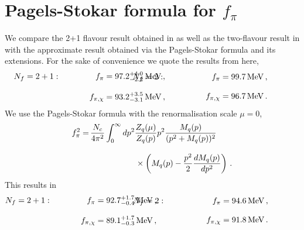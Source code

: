 \documentclass[aps,twocolumn,prd,superscriptaddress]{revtex4-2}
\begin{document}
\section{Pagels-Stokar formula for $f_\pi$}
\label{app:other_fpi}

We compare the 2+1 flavour result obtained in  as well as the two-flavour result in  with the approximate result obtained via the Pagels-Stokar formula and its extensions. For the sake of convenience we quote the results from   here, 
%
\begin{subequations}\label{eq:fpiresults2}
	\begin{align}
		\hspace{-1cm}N_f=2+1:\hspace{1.5cm}
		f_\pi &= 97.2^{+4.0}_{-2.2}\,\unit{\MeV}\,,
		\notag \\[2ex]
		f_{\pi,\chi} &= 93.2^{+3.5}_{-3.1}\,\unit{\MeV}\,,
	\end{align}
	\begin{align}
		\hspace{-1.4cm}N_f=2:\hspace{2cm} 	
		f_\pi &= \qty{99.7}{\MeV}\,,
		\notag \\[2ex]
		f_{\pi,\chi} &= \qty{96.7}{\MeV}\,.
	\end{align}
\end{subequations}
%
We use the Pagels-Stokar formula \cite{Pagels:1979hd} with the renormalisation scale $\mu= 0$,
%
\begin{align}\label{eq:fpi_PS}
	f_\pi^2 =&\,  \frac{N_c}{4\pi^2} \int_0^\infty  dp^2 \frac{Z_q(\mu)}{Z_q(p)} p^2 \frac{M_q(p)}{(p^2 + M_q(p))^2}\notag                            \\[2ex]
	& \hspace{2cm}\times	\left(M_q(p) - \frac{p^2}{2}\frac{dM_q(p)}{dp^2}\right)\,.
\end{align}
%
This results in
%
\begin{subequations}\label{eq:fpi_PSresults}
	\begin{align}
		\hspace{-1cm}N_f=2+1:\hspace{1.5cm} 	
		f_\pi &= 92.7^{+1.7}_{-0.4}\,\unit{\MeV}\,,
		\notag \\[2ex]
		f_{\pi,\chi} &= 89.1^{+1.7}_{-0.3}\,\unit{\MeV}\,,
	\end{align}
	\begin{align}
		\hspace{-1cm}N_f=2:\hspace{2cm} 	
		f_\pi &= \qty{94.6}{\MeV}\,,
		\notag \\[2ex]
		f_{\pi,\chi} &= \qty{91.8}{\MeV}\,.\quad
	\end{align}
\end{subequations}
\end{document}
